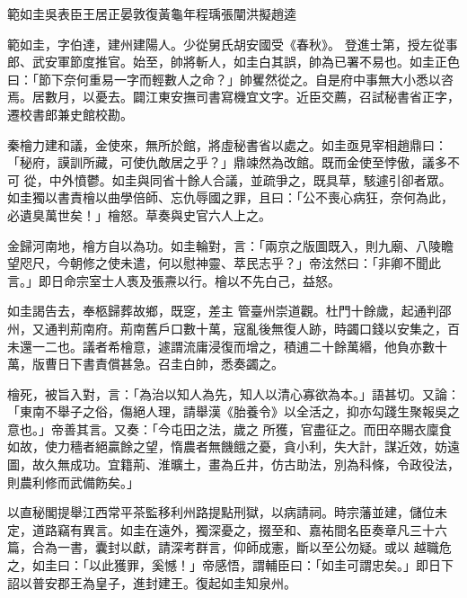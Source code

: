 
\begin{pinyinscope}

 範如圭吳表臣王居正晏敦復黃龜年程瑀張闡洪擬趙逵



 範如圭，字伯達，建州建陽人。少從舅氏胡安國受《春秋》。
 登進士第，授左從事郎、武安軍節度推官。始至，帥將斬人，如圭白其誤，帥為已署不易也。如圭正色曰：「節下奈何重易一字而輕數人之命？」帥矍然從之。自是府中事無大小悉以咨焉。居數月，以憂去。闢江東安撫司書寫機宜文字。近臣交薦，召試秘書省正字，遷校書郎兼史館校勘。



 秦檜力建和議，金使來，無所於館，將虛秘書省以處之。如圭亟見宰相趙鼎曰：「秘府，謨訓所藏，可使仇敵居之乎？」鼎竦然為改館。既而金使至悖傲，議多不可
 從，中外憤鬱。如圭與同省十餘人合議，並疏爭之，既具草，駭遽引卻者眾。如圭獨以書責檜以曲學倍師、忘仇辱國之罪，且曰：「公不喪心病狂，奈何為此，必遺臭萬世矣！」檜怒。草奏與史官六人上之。



 金歸河南地，檜方自以為功。如圭輪對，言：「兩京之版圖既入，則九廟、八陵瞻望咫尺，今朝修之使未遣，何以慰神靈、萃民志乎？」帝泫然曰：「非卿不聞此言。」即日命宗室士人褭及張燾以行。檜以不先白己，益怒。



 如圭謁告去，奉柩歸葬故鄉，既窆，差主
 管臺州崇道觀。杜門十餘歲，起通判邵州，又通判荊南府。荊南舊戶口數十萬，寇亂後無復人跡，時蠲口錢以安集之，百未還一二也。議者希檜意，遽謂流庸浸復而增之，積逋二十餘萬緡，他負亦數十萬，版曹日下書責償甚急。召圭白帥，悉奏蠲之。



 檜死，被旨入對，言：「為治以知人為先，知人以清心寡欲為本。」語甚切。又論：「東南不舉子之俗，傷絕人理，請舉漢《胎養令》以全活之，抑亦勾踐生聚報吳之意也。」帝善其言。又奏：「今屯田之法，歲之
 所獲，官盡征之。而田卒賜衣廩食如故，使力穡者絕贏餘之望，惰農者無饑餓之憂，貪小利，失大計，謀近效，妨遠圖，故久無成功。宜籍荊、淮曠土，畫為丘井，仿古助法，別為科條，令政役法，則農利修而武備飭矣。」



 以直秘閣提舉江西常平茶監移利州路提點刑獄，以病請祠。時宗藩並建，儲位未定，道路竊有異言。如圭在遠外，獨深憂之，掇至和、嘉祐間名臣奏章凡三十六篇，合為一書，囊封以獻，請深考群言，仰師成憲，斷以至公勿疑。或以
 越職危之，如圭曰：「以此獲罪，奚憾！」帝感悟，謂輔臣曰：「如圭可謂忠矣。」即日下詔以普安郡王為皇子，進封建王。復起如圭知泉州。




\end{pinyinscope}
